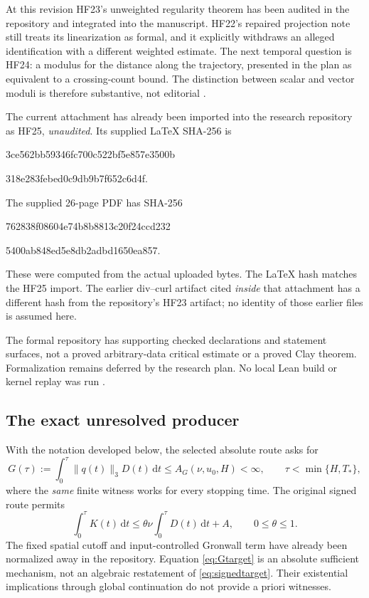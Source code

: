 \documentclass[11pt,a4paper]{article}
\theoremstyle{definition}\newtheorem{definition}[theorem]{Definition}
\theoremstyle{remark}\newtheorem{remark}[theorem]{Remark}
\newcommand{\dd}{\,\mathrm d}
\newcommand{\norm}[1]{\lVert #1\rVert}
\numberwithin{equation}{section}
\begin{document}
At this revision HF23's unweighted regularity theorem has been audited in the repository and integrated into the manuscript. HF22's repaired projection note still treats its linearization as formal, and it explicitly withdraws an alleged identification with a different weighted estimate. The next temporal question is HF24: a modulus for the distance along the trajectory, presented in the plan as equivalent to a crossing-count bound. The distinction between scalar and vector moduli is therefore substantive, not editorial \cite{Research,Projection,GoodSet}.

The current attachment has already been imported into the research repository as HF25, \emph{unaudited}. Its supplied LaTeX SHA-256 is
\begin{center}\small\ttfamily
3ce562bb59346fc700c522bf5e857e3500b\par
318e283febed0c9db9b7f652c6d4f.
\end{center}
The supplied 26-page PDF has SHA-256
\begin{center}\small\ttfamily
762838f08604e74b8b8813c20f24ccd232\par
5400ab848ed5e8db2adbd1650ea857.
\end{center}
These were computed from the actual uploaded bytes. The LaTeX hash matches the HF25 import. The earlier div--curl artifact cited \emph{inside} that attachment has a different hash from the repository's HF23 artifact; no identity of those earlier files is assumed here.

The formal repository has supporting checked declarations and statement surfaces, not a proved arbitrary-data critical estimate or a proved Clay theorem. Formalization remains deferred by the research plan. No local Lean build or kernel replay was run \cite{Formal}.

\subsection{The exact unresolved producer}
With the notation developed below, the selected absolute route asks for
\begin{equation}\label{eq:Gtarget}
 G(\tau):=\int_0^\tau\norm{q(t)}_3D(t)\dd t
 \le A_G(\nu,u_0,H)<\infty,
 \qquad \tau<\min\{H,T_*\},
\end{equation}
where the \emph{same} finite witness works for every stopping time. The original signed route permits
\begin{equation}\label{eq:signedtarget}
 \int_0^\tau K(t)\dd t
 \le\theta\nu\int_0^\tau D(t)\dd t+A,
 \qquad 0\le\theta\le1.
\end{equation}
The fixed spatial cutoff and input-controlled Gronwall term have already been normalized away in the repository. Equation \eqref{eq:Gtarget} is an absolute sufficient mechanism, not an algebraic restatement of \eqref{eq:signedtarget}. Their existential implications through global continuation do not provide a priori witnesses.
\end{document}
